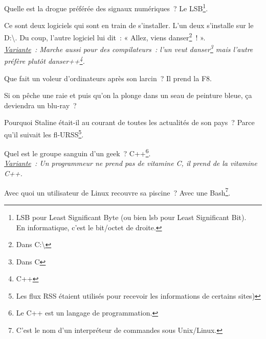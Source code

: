 \documentclass[10pt,a5paper,fullpage]{book}
\begin{document}
\begin{enumerate}
{		%
		\item Quelle est la drogue préférée des signaux numériques~? Le LSB\footnote{LSB pour Least Significant Byte (ou bien lsb pour Least Significant Bit). \\En informatique, c’est le bit/octet de droite.}.
		\item Ce sont deux logiciels qui sont en train de s’installer. L’un deux s’installe sur le D:\textbackslash. Du coup, l’autre logiciel lui dit~: « Allez, viens danser\footnote{Dans C:\textbackslash}~! ».
		\\\textit{\underline{Variante}~: Marche aussi pour des compilateurs~: l'un veut danser\footnote{Dans C} mais l'autre préfère plutôt danser++\footnote{C++}.}
		\item Que fait un voleur d’ordinateurs après son larcin~? Il prend la F8.
		\item Si on pêche une raie et puis qu’on la plonge dans un seau de peinture bleue, ça deviendra un blu-ray~?
		\item Pourquoi Staline était-il au courant de toutes les actualités de son pays~? Parce qu’il suivait les fl-URSS\footnote{Les flux RSS étaient utilisés pour recevoir les informations de certains sites)}.
		\item Quel est le groupe sanguin d’un geek~? C++\footnote{Le C++ est un langage de programmation.}.
		\\\textit{\underline{Variante}~: Un programmeur ne prend pas de vitamine C, il prend de la vitamine C++.}
		\item Avec quoi un utilisateur de Linux recouvre sa piscine~? Avec une Bash\footnote{C'est le nom d'un interpréteur de commandes sous Unix/Linux.}.
}
\end{enumerate}
\end{document}
